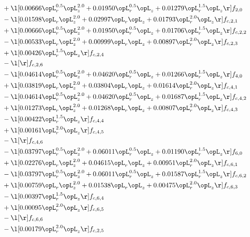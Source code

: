 \begin{alignat}{2}
& + \l[  0.00666 \opL_r^{0.5} \opL_z^{2.0} +  0.01950 \opL_r^{0.5} \opL_z +  0.01279 \opL_r^{1.5} \opL_z  \r] f_{2,0} \nonumber \\ 
& - \l[  0.01598 \opL_r \opL_z^{2.0} +  0.02997 \opL_r \opL_z +  0.01793 \opL_r^{2.0} \opL_z  \r] f_{c,2,1} \nonumber \\ 
& + \l[  0.00666 \opL_r^{0.5} \opL_z^{2.0} +  0.01950 \opL_r^{0.5} \opL_z +  0.01706 \opL_r^{1.5} \opL_z  \r] f_{c,2,2} \nonumber \\ 
& - \l[  0.00533 \opL_r \opL_z^{2.0} +  0.00999 \opL_r \opL_z +  0.00897 \opL_r^{2.0} \opL_z  \r] f_{c,2,3} \nonumber \\ 
& + \l[  0.00426 \opL_r^{1.5} \opL_z  \r] f_{c,2,4} \nonumber \\ 
& - \l[  \r] f_{c,2,6} \nonumber \\ 
& - \l[  0.04614 \opL_r^{0.5} \opL_z^{2.0} +  0.04620 \opL_r^{0.5} \opL_z +  0.01266 \opL_r^{1.5} \opL_z  \r] f_{4,0} \nonumber \\ 
& + \l[  0.03819 \opL_r \opL_z^{2.0} +  0.03804 \opL_r \opL_z +  0.01614 \opL_r^{2.0} \opL_z  \r] f_{c,4,1} \nonumber \\ 
& - \l[  0.04614 \opL_r^{0.5} \opL_z^{2.0} +  0.04620 \opL_r^{0.5} \opL_z +  0.01687 \opL_r^{1.5} \opL_z  \r] f_{c,4,2} \nonumber \\ 
& + \l[  0.01273 \opL_r \opL_z^{2.0} +  0.01268 \opL_r \opL_z +  0.00807 \opL_r^{2.0} \opL_z  \r] f_{c,4,3} \nonumber \\ 
& - \l[  0.00422 \opL_r^{1.5} \opL_z  \r] f_{c,4,4} \nonumber \\ 
& + \l[  0.00161 \opL_r^{2.0} \opL_z  \r] f_{c,4,5} \nonumber \\ 
& - \l[  \r] f_{c,4,6} \nonumber \\ 
& - \l[  0.03797 \opL_r^{0.5} \opL_z^{2.0} +  0.06011 \opL_r^{0.5} \opL_z +  0.01190 \opL_r^{1.5} \opL_z  \r] f_{6,0} \nonumber \\ 
& + \l[  0.02276 \opL_r \opL_z^{2.0} +  0.04615 \opL_r \opL_z +  0.00951 \opL_r^{2.0} \opL_z  \r] f_{c,6,1} \nonumber \\ 
& - \l[  0.03797 \opL_r^{0.5} \opL_z^{2.0} +  0.06011 \opL_r^{0.5} \opL_z +  0.01587 \opL_r^{1.5} \opL_z  \r] f_{c,6,2} \nonumber \\ 
& + \l[  0.00759 \opL_r \opL_z^{2.0} +  0.01538 \opL_r \opL_z +  0.00475 \opL_r^{2.0} \opL_z  \r] f_{c,6,3} \nonumber \\ 
& - \l[  0.00397 \opL_r^{1.5} \opL_z  \r] f_{c,6,4} \nonumber \\ 
& + \l[  0.00095 \opL_r^{2.0} \opL_z  \r] f_{c,6,5} \nonumber \\ 
& - \l[  \r] f_{c,6,6} \nonumber \\ 
& - \l[  0.00179 \opL_r^{2.0} \opL_z  \r] f_{c,2,5} \nonumber \\ 
\end{alignat} 



